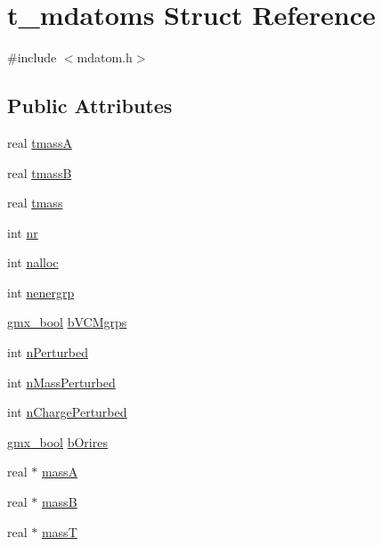 \hypertarget{structt__mdatoms}{\section{t\-\_\-mdatoms \-Struct \-Reference}
\label{structt__mdatoms}
}


{\ttfamily \#include $<$mdatom.\-h$>$}

\subsection*{\-Public \-Attributes}
\begin{DoxyCompactItemize}
\item 
real \hyperlink{structt__mdatoms_aa122f8a363598842d2d717a27d2c0243}{tmass\-A}
\item 
real \hyperlink{structt__mdatoms_ae55996d084a8607b48d8c0bb9e657191}{tmass\-B}
\item 
real \hyperlink{structt__mdatoms_a20bb948e877f68a0ff2ca046639a88c8}{tmass}
\item 
int \hyperlink{structt__mdatoms_a4159e0ed7c1e058c97983d79caedb5c5}{nr}
\item 
int \hyperlink{structt__mdatoms_a681bf8cd8f47f46016833c17aebda43d}{nalloc}
\item 
int \hyperlink{structt__mdatoms_a1868b4bac42629c0e907e1c8afda9e56}{nenergrp}
\item 
\hyperlink{include_2types_2simple_8h_a8fddad319f226e856400d190198d5151}{gmx\-\_\-bool} \hyperlink{structt__mdatoms_aee2192e9b9995f2a3d59cbeffcd6886b}{b\-V\-C\-Mgrps}
\item 
int \hyperlink{structt__mdatoms_a283f52d82589d5f9059a13988f4525f7}{n\-Perturbed}
\item 
int \hyperlink{structt__mdatoms_abb7372424fa03a9e2994690f8b63f4de}{n\-Mass\-Perturbed}
\item 
int \hyperlink{structt__mdatoms_af8f008a0c90a7ac5e97fd87293a0ea73}{n\-Charge\-Perturbed}
\item 
\hyperlink{include_2types_2simple_8h_a8fddad319f226e856400d190198d5151}{gmx\-\_\-bool} \hyperlink{structt__mdatoms_a4412c8474af1e6626571ea6d66df3765}{b\-Orires}
\item 
real $\ast$ \hyperlink{structt__mdatoms_a2c68cbf5587c05a5aa84c52bf9096225}{mass\-A}
\item 
real $\ast$ \hyperlink{structt__mdatoms_a8cb7690f0a8407c1d98f1918ba162975}{mass\-B}
\item 
real $\ast$ \hyperlink{structt__mdatoms_adc61b992b2612801549274dce07455c2}{mass\-T}

\end{DoxyCompactItemize}
